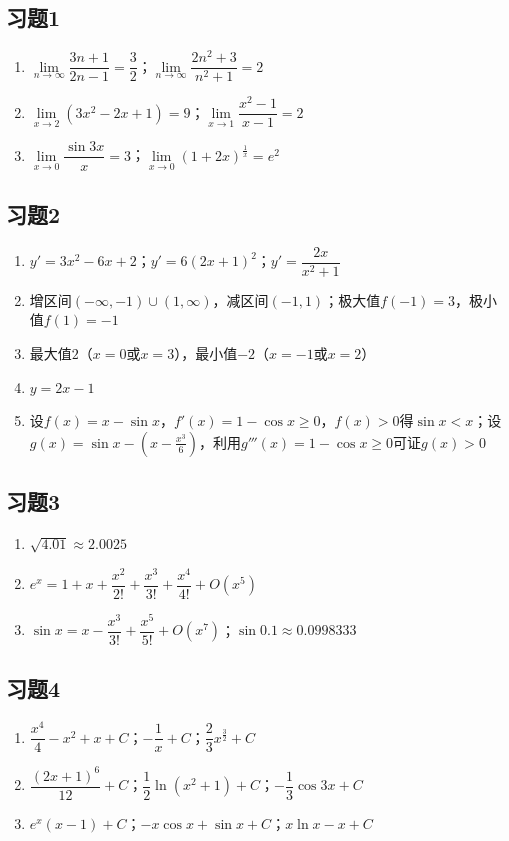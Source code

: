 \documentclass[a4paper,12pt]{ctexart}
\begin{document}
\newpage
{}

\subsection*{习题1}
\begin{enumerate}
  \item $\lim\limits_{n\to\infty}\dfrac{3n+1}{2n-1}=\dfrac32$；$\lim\limits_{n\to\infty}\dfrac{2n^2+3}{n^2+1}=2$
  \item $\lim\limits_{x\to2}(3x^2-2x+1)=9$；$\lim\limits_{x\to1}\dfrac{x^2-1}{x-1}=2$
  \item $\lim\limits_{x\to0}\dfrac{\sin3x}{x}=3$；$\lim\limits_{x\to0}(1+2x)^{\frac1x}=e^2$
\end{enumerate}

\subsection*{习题2}
\begin{enumerate}
  \item $y'=3x^2-6x+2$；$y'=6(2x+1)^2$；$y'=\dfrac{2x}{x^2+1}$
  \item 增区间$(-\infty,-1)\cup(1,\infty)$，减区间$(-1,1)$；极大值$f(-1)=3$，极小值$f(1)=-1$
  \item 最大值$2$（$x=0$或$x=3$），最小值$-2$（$x=-1$或$x=2$）
  \item $y=2x-1$
  \item 设$f(x)=x-\sin x$，$f'(x)=1-\cos x\ge0$，$f(x)>0$得$\sin x<x$；设$g(x)=\sin x-(x-\frac{x^3}{6})$，利用$g'''(x)=1-\cos x\ge0$可证$g(x)>0$
\end{enumerate}

\subsection*{习题3}
\begin{enumerate}
  \item $\sqrt{4.01}\approx2.0025$
  \item $e^x=1+x+\dfrac{x^2}{2!}+\dfrac{x^3}{3!}+\dfrac{x^4}{4!}+O(x^5)$
  \item $\sin x=x-\dfrac{x^3}{3!}+\dfrac{x^5}{5!}+O(x^7)$；$\sin0.1\approx0.0998333$
\end{enumerate}

\subsection*{习题4}
\begin{enumerate}
  \item $\dfrac{x^4}{4}-x^2+x+C$；$-\dfrac1x+C$；$\dfrac23x^{\frac32}+C$
  \item $\dfrac{(2x+1)^6}{12}+C$；$\dfrac12\ln(x^2+1)+C$；$-\dfrac13\cos3x+C$
  \item $e^x(x-1)+C$；$-x\cos x+\sin x+C$；$x\ln x-x+C$
\end{enumerate}
\end{document}
